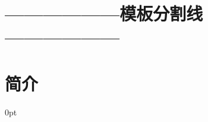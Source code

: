 \documentclass[zihao=-4]{ctexart}
\newcommand{\setParDis}{\setlength {\parskip} {0pt} }
\begin{document}

\section{——————模板分割线——————}
\section{简介}
\setParDis %
\end{document}

